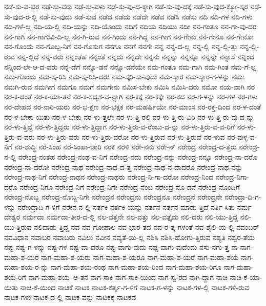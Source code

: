 {ನಡೆ-ಸು-ವ-ವರ
ನಡೆ-ಸು-ವರು
ನಡೆ-ಸು-ವಳು
ನಡೆ-ಸು-ವು-ದ-ಕ್ಕಾಗಿ
ನಡೆ-ಸು-ವು-ದಕ್ಕೆ
ನಡೆ-ಸು-ವುದ-ಕ್ಕೋ-ಸ್ಕರ
ನಡೆ-ಸು-ವುದ-ರ-ಲ್ಲಿ
ನಡೆ-ಸು-ವುದು
ನಡೆ-ಸುವ
ನಡೆದ
ನಡೆದು
ನಡೆದೇ
ನಡೆವ
ನಡೆಸಿ
ನಡೆಸು
ನದಿ
ನದಿ-ಗಳ
ನದಿ-ಗಳು
ನದಿ-ಗಳೆ-ಲ್ಲ
ನದಿ-ಯ-ಲ್ಲಿ
ನದಿ-ಯನ್ನು
ನದಿ-ಯೊಂದು
ನದಿಗೆ
ನದಿಯ
ನದಿಯು
ನದೀ
ನನ-ಗಂತೂ
ನನ-ಗಾ-ವು-ದರ
ನನ-ಗಾಗಿ
ನನ-ಗಾಗುವಿ-ದಿ-ಲ್ಲ
ನನ-ಗಿ-ರುವ
ನನ-ಗಿಂದು
ನನ-ಗಿದ್ದ
ನನ-ಗೀಗ
ನನ-ಗೇನು
ನನ-ಗೇನೂ
ನನ-ಗೇನೋ
ನನ-ಗೊಂದು
ನನ-ಗೊಬ್ಬ-ನಿಗೆ
ನನ-ಗೊಸುಗ
ನನಗೂ
ನನಗೆ
ನನಗೇ
ನನ್ನ
ನನ್ನ-ದ-ಲ್ಲ
ನನ್ನ-ಲ್ಲಿ
ನನ್ನ-ಲ್ಲಿ-ತ್ತು
ನನ್ನ-ಲ್ಲಿ-ರುವ
ನನ್ನ-ಲ್ಲಿದೆ
ನನ್ನ-ವರು
ನನ್ನಂತಹ
ನನ್ನಂತೆ
ನನ್ನದು
ನನ್ನದೇ
ನನ್ನನು
ನನ್ನನ್ನು
ನನ್ನನ್ನೂ
ನನ್ನನ್ನೇ
ನನ್ನಾಸೆ
ನನ್ನಿಂದ
ನನ್ನಿಂದ-ಲೇ-ಆ-ದ-ವರು
ನನ್ನೆ-ಡೆಗೆ
ನನ್ನೊ-ಡನೆ
ನನ್ನೊ-ಡನೆಯೇ
ನಮ-ಗಂತೂ
ನಮ-ಗಾಗಿ
ನಮ-ಗಿಂತ
ನಮ-ಗೆ-ಲ್ಲ
ನಮ-ಗೊಂದು
ನಮ-ಸ್ಕ-ರಿಸಿ
ನಮ-ಸ್ಕ-ರಿಸಿ-ದರು
ನಮ-ಸ್ಕರಿ-ಸು-ವುದು
ನಮ-ಸ್ಕಾರ
ನಮ-ಸ್ಕಾರ-ಗ-ಳನ್ನು
ನಮಃ
ನಮಗಿ-ರುವ
ನಮಗೀಗ
ನಮಗೂ
ನಮಗೆ
ನಮಗೇನು
ನಮಿಸ-ಬೇಕು
ನಮಿಸಿ
ನಮಿಸಿ-ದರು
ನಮೋ
ನಯ-ವಾಗಿ
ನರ
ನರ-ಕ-ದಂತೆ
ನರ-ಕ-ಯಾ-ತನೆ
ನರ-ಕ-ಸದೃಶ-ವ-ನ್ನಾಗಿ
ನರ-ಕಕ್ಕೆ
ನರ-ಕಕ್ಕೇ
ನರ-ಕದ
ನರ-ಗ-ಳನ್ನು
ನರ-ಗಳ
ನರ-ಗಳು
ನರ-ದೇಹದ
ನರ-ನಾರಿ-ಯರು
ನರ-ಭ-ಕ್ಷಣ
ನರ-ಭಕ್ಷಕ
ನರ-ಮಹರ್ಷಿಯೇ
ನರ-ಮಾಂಸ
ನರ-ರಕ್ತ-ದಿಂದ
ನರ-ಳ-ದಂತೆ
ನರ-ಳ-ಬೇಕಾ-ಯಿತು
ನರ-ಳ-ಬೇಕು
ನರ-ಳು-ತ್ತಲೇ
ನರ-ಳು-ತ್ತಿ-ರಲಿ
ನರ-ಳು-ತ್ತಿ-ರು-ವಿರಿ
ನರ-ಳು-ತ್ತಿ-ರು-ವು-ದ-ನ್ನು
ನರ-ಳು-ತ್ತಿದ್ದ
ನರ-ಳು-ತ್ತಿದ್ದರು
ನರ-ಳು-ತ್ತಿದ್ದಾಗ
ನರ-ಳು-ತ್ತಿರು-ವ-ರೆಂಬು-ದ-ನ್ನು
ನರ-ಳು-ತ್ತಿರು-ವ-ವ-ರಿಗೆ
ನರ-ಳು-ತ್ತಿರು-ವ-ವರು
ನರ-ಳು-ತ್ತಿರು-ವರು
ನರ-ಳು-ತ್ತಿರು-ವರೋ
ನರ-ಳು-ತ್ತಿರುವ
ನರ-ಳು-ತ್ತಿರುವೆ
ನರ-ಳುವ
ನರ-ವುಳ್ಳ-ವ-ನಿಗೆ
ನರ-ಶುದ್ಧಿ
ನರ-ಸಿಂಹ
ನರ-ಸಿಂಹಾ-ಚಾರಿ
ನರಕ
ನರಳಿ
ನರೇ-ನನು
ನರೇ-ನ್
ನರೇಂದ್ರ
ನರೇಂದ್ರ-ದ-ತ್ತರು
ನರೇಂದ್ರ-ನ-ಲ್ಲಿ
ನರೇಂದ್ರ-ನಂತಹ
ನರೇಂದ್ರ-ನಂಥ-ವ-ನಿಗೆ
ನರೇಂದ್ರ-ನದು
ನರೇಂದ್ರ-ನನ್ನು
ನರೇಂದ್ರ-ನನ್ನೂ
ನರೇಂದ್ರ-ನಾ-ದರೊ
ನರೇಂದ್ರ-ನಾ-ದರೋ
ನರೇಂದ್ರ-ನಾಥ
ನರೇಂದ್ರ-ನಾಥ-ದ-ತ್ತ
ನರೇಂದ್ರ-ನಾಥ-ನ-ದಾದರೊ
ನರೇಂದ್ರ-ನಾಥ-ನನ್ನು
ನರೇಂದ್ರ-ನಾಥ-ನಿಗೆ
ನರೇಂದ್ರ-ನಾಥನ
ನರೇಂದ್ರ-ನಾಥರು
ನರೇಂದ್ರ-ನಿ-ಗಾ-ದರೋ
ನರೇಂದ್ರ-ನಿಂದ
ನರೇಂದ್ರ-ನಿಗಾ-ದರೊ
ನರೇಂದ್ರ-ನಿಗೂ
ನರೇಂದ್ರ-ನಿಗೆ
ನರೇಂದ್ರ-ನಿಗೇ
ನರೇಂದ್ರ-ನೆಂಬ
ನರೇಂದ್ರ-ನೊ-ಡನೆ
ನರೇಂದ್ರ-ನೊಂದಿಗೆ
ನರೇಂದ್ರ-ನೊಬ್ಬ
ನರೇಂದ್ರ-ನೊಬ್ಬ-ನಿಗೇ
ನರೇಂದ್ರನ
ನರೇಂದ್ರನು
ನರೇಂದ್ರನೂ
ನರೇಂದ್ರನೆ
ನರೇಂದ್ರನೇ
ನರೇಂದ್ರಾ-ದಿ-ಗ-ಳನ್ನು
ನರೇಂದ್ರಾದಿ-ಗ-ಳಿಗೆ
ನರೇನ-ನ-ಲ್ಲಿ
ನರ್ತಕಿ
ನರ್ತಕಿ-ಯನ್ನು
ನರ್ತನ
ನರ್ತನ-ಮಾಡು-ತ್ತಿದೆ
ನರ್ತಿ-ಸಿತು
ನರ್ಮ-ದೇಶ್ವರ
ನರ್ಮದಾ
ನರ್ಮದಾ-ತೀರ-ದ-ಲ್ಲಿ
ನಲ-ವತ್ತನೇ
ನಲ-ವತ್ತು
ನಲ-ವತ್ತೈದು
ನಲಿ-ದರು
ನಲಿ-ಯು-ತ್ತಿದ್ದ
ನಲಿ-ಯು-ತ್ತಿರುವ
ನಲಿದಾಡು-ತ್ತಿದ್ದ
ನವ
ನವ-ಗೋಪಾಲ
ನವ-ಭಾರ-ತದ
ನವ-ರ-ತ್ನ-ಗಳಂತೆ
ನವ-ಶೈಲಿ-ಯ-ಲ್ಲಿ
ನವಂಬರ್
ನವವಿಧಾನ
ನವಾಬರ
ನವಾಬರು
ನವಿಲು
ನವೀನ
ನವ್ಯತೆ-ಯಿ-ಲ್ಲ
ನಶಿಸಿ
ನಶಿಸಿ-ಹೋಗು-ತ್ತಿರುವ
ನಶ್ಯತಿ
ನಶ್ವರ-ತೆಯ
ನಷ್ಟ
ನಷ್ಟ-ಗ-ಳನ್ನು
ನಷ್ಟ-ಗಳ
ನಷ್ಟ-ವಾ-ದರೂ
ನಷ್ಟ-ವಾಗು-ವುದು
ನಷ್ಟ-ವಾಗು-ವುದೆಂದು
ನಸು-ನಗು-ತ್ತ
ನಾ
ನಾಗ-ಮಹಾ-ಶ-ಯರ
ನಾಗ-ಮಹಾ-ಶ-ಯರು
ನಾಗ-ಮಹಾ-ಶ-ಯರೂ
ನಾಗ-ಮಹಾ-ಶ-ಯರೆ
ನಾಗ-ಮಹಾ-ಶಯ
ನಾಗ-ಮಹಾ-ಶಯ-ರ-ನ್ನು
ನಾಗ-ಮಹಾ-ಶಯ-ರಂಥ
ನಾಗ-ಮಹಾ-ಶಯ-ರಿಂದ
ನಾಗ-ಮಹಾ-ಶಯ-ರಿಗೂ
ನಾಗ-ಮಹಾ-ಶಯ-ರಿಗೆ
ನಾಗ-ಮಹಾ-ಶಯ--ಆ-ತನ
ನಾಗ-ಸಾಕಿ
ನಾಗ-ಸಾಕಿ-ಯಿಂದ
ನಾಗ-ಸ್ವ-ರದ
ನಾಗಿ-ದ್ದಾಗ
ನಾಚಿ
ನಾಚಿ-ಕೆ-ಯಾ-ಯಿತು
ನಾಚಿ-ಕೆ-ಯಿಂದ
ನಾಚಿಕೆ
ನಾಟಕ
ನಾಟಕ-ಕರ್ತೃ-ಗ-ಳಿಗೆ
ನಾಟಕ-ಗ-ಳನ್ನು
ನಾಟಕ-ಗಳ-ಲ್ಲಿ
ನಾಟಕ-ಗಳಿ-ರುವ
ನಾಟಕ-ಗಳು
ನಾಟಕ-ದ-ಲ್ಲಿ
ನಾಟಕ-ವನ್ನು
ನಾಟಕಕ್ಕೆ
ನಾಟಕದ
}
